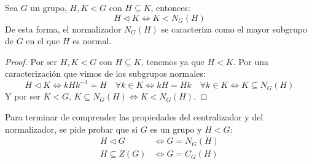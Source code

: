 \begin{prop} %
    Sea $G$ un grupo, $H,K< G$ con $H\subseteq K$, entonces:
    \begin{equation*}
        H \lhd K \Longleftrightarrow K < N_G(H)
    \end{equation*}
    De esta forma, el normalizador $N_G(H)$ se caracteriza como el mayor subgrupo de $G$ en el que $H$ es normal.
    \begin{proof}
        Por ser $H,K<G$ con $H\subseteq K$, tenemos ya que $H<K$. Por una caracterización que vimos de los subgrupos normales:
        \begin{equation*}
            H\lhd K \Longleftrightarrow kHk^{-1} = H \quad \forall k\in K \Longleftrightarrow kH = Hk \quad \forall k\in K \Longleftrightarrow K \subseteq N_G(H) 
        \end{equation*}
        Y por ser $K<G$, $K\subseteq N_G(H) \Longleftrightarrow K<N_G(H)$.
    \end{proof}
\end{prop}

\begin{ejercicio*}
    Para terminar de comprender las propiedades del centralizador y del normalizador, se pide probar que si $G$ es un grupo y $H<G$:
    \begin{align*}
        H\lhd G &\Longleftrightarrow G = N_G(H) \\
        H\subseteq Z(G) &\Longleftrightarrow G = C_G(H)
    \end{align*}
\end{ejercicio*}

